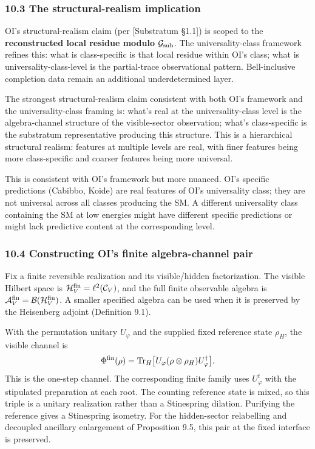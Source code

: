 \documentclass[
]{article}
\begin{document}
\hypertarget{the-structural-realism-implication}{%
\subsubsection{10.3 The structural-realism
implication}\label{the-structural-realism-implication}}

OI's structural-realism claim (per {[}Substratum §1.1{]}) is scoped to
the \textbf{reconstructed local residue modulo}
\(\mathcal{G}_{\rm sub}\). The universality-class framework refines
this: what is class-specific is that local residue within OI's class;
what is universality-class-level is the partial-trace observational
pattern. Bell-inclusive completion data remain an additional
underdetermined layer.

The strongest structural-realism claim consistent with both OI's
framework and the universality-class framing is: what's real at the
universality-class level is the algebra-channel structure of the
visible-sector observation; what's class-specific is the substratum
representative producing this structure. This is a hierarchical
structural realism: features at multiple levels are real, with finer
features being more class-specific and coarser features being more
universal.

This is consistent with OI's framework but more nuanced. OI's specific
predictions (Cabibbo, Koide) are real features of OI's universality
class; they are not universal across all classes producing the SM. A
different universality class containing the SM at low energies might
have different specific predictions or might lack predictive content at
the corresponding level.

\hypertarget{constructing-ois-finite-algebra-channel-pair}{%
\subsubsection{10.4 Constructing OI's finite algebra-channel
pair}\label{constructing-ois-finite-algebra-channel-pair}}

Fix a finite reversible realization and its visible/hidden
factorization. The visible Hilbert space is
\(\mathcal H_V^{\rm fin}=\ell^2(\mathcal C_V)\), and the full finite
observable algebra is
\(\mathcal A_V^{\rm fin}=\mathcal B(\mathcal H_V^{\rm fin})\). A smaller
specified algebra can be used when it is preserved by the Heisenberg
adjoint (Definition 9.1).

With the permutation unitary \(U_\varphi\) and the supplied fixed
reference state \(\rho_H\), the visible channel is
\[\Phi^{\rm fin}(\rho)=\mathrm{Tr}_H\big[U_\varphi(\rho\otimes\rho_H)U_\varphi^\dagger\big].\]
This is the one-step channel. The corresponding finite family uses
\(U_\varphi^t\) with the stipulated preparation at each root. The
counting reference state is mixed, so this triple is a unitary
realization rather than a Stinespring dilation. Purifying the reference
gives a Stinespring isometry. For the hidden-sector relabelling and
decoupled ancillary enlargement of Proposition 9.5, this pair at the
fixed interface is preserved.
\end{document}
